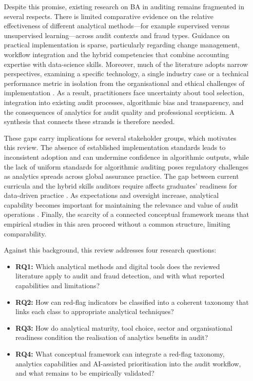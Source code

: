 \documentclass[conference]{IEEEtran}
\begin{document}
Despite this promise, existing research on BA in auditing remains fragmented in several respects. There is limited comparative evidence on the relative effectiveness of different analytical methods---for example supervised versus unsupervised learning---across audit contexts and fraud types. Guidance on practical implementation is sparse, particularly regarding change management, workflow integration and the hybrid competencies that combine accounting expertise with data-science skills. Moreover, much of the literature adopts narrow perspectives, examining a specific technology, a single industry case or a technical performance metric in isolation from the organisational and ethical challenges of implementation \cite{b12}. As a result, practitioners face uncertainty about tool selection, integration into existing audit processes, algorithmic bias and transparency, and the consequences of analytics for audit quality and professional scepticism. A synthesis that connects these strands is therefore needed.

These gaps carry implications for several stakeholder groups, which motivates this review. The absence of established implementation standards leads to inconsistent adoption and can undermine confidence in algorithmic outputs, while the lack of uniform standards for algorithmic auditing poses regulatory challenges as analytics spreads across global assurance practice. The gap between current curricula and the hybrid skills auditors require affects graduates' readiness for data-driven practice \cite{b13}. As expectations and oversight increase, analytical capability becomes important for maintaining the relevance and value of audit operations \cite{b14}. Finally, the scarcity of a connected conceptual framework means that empirical studies in this area proceed without a common structure, limiting comparability.

Against this background, this review addresses four research questions:
\begin{itemize}
    \item \textbf{RQ1:} Which analytical methods and digital tools does the reviewed literature apply to audit and fraud detection, and with what reported capabilities and limitations?
    \item \textbf{RQ2:} How can red-flag indicators be classified into a coherent taxonomy that links each class to appropriate analytical techniques?
    \item \textbf{RQ3:} How do analytical maturity, tool choice, sector and organisational readiness condition the realisation of analytics benefits in audit?
    \item \textbf{RQ4:} What conceptual framework can integrate a red-flag taxonomy, analytics capabilities and AI-assisted prioritisation into the audit workflow, and what remains to be empirically validated?
\end{itemize}
\end{document}
